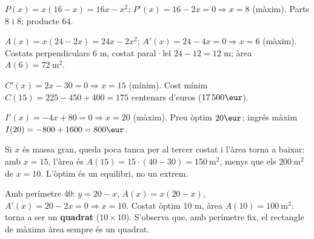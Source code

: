 \begin{solucions}
\begin{sollist}
  \item $P(x)=x(16-x)=16x-x^2$; $P'(x)=16-2x=0\Rightarrow x=8$ (màxim). Parts $8$ i $8$;
        producte $64$.
  \item $A(x)=x(24-2x)=24x-2x^2$; $A'(x)=24-4x=0\Rightarrow x=6$ (màxim). Costats
        perpendiculars $6$ m, costat paral·lel $24-12=12$ m; àrea $A(6)=72\ \text{m}^2$.
  \item $C'(x)=2x-30=0\Rightarrow x=15$ (mínim). Cost mínim $C(15)=225-450+400=175$
        centenars d'euros ($17\,500\eur$).
  \item $I'(x)=-4x+80=0\Rightarrow x=20$ (màxim). Preu òptim $20\eur$; ingrés màxim
        $I(20)=-800+1600=800\eur$.
  \item Si $x$ és massa gran, queda poca tanca per al tercer costat i l'àrea torna a
        baixar: amb $x=15$, l'àrea és $A(15)=15\cdot(40-30)=150\ \text{m}^2$, menys que
        els $200\ \text{m}^2$ de $x=10$. L'òptim és un equilibri, no un extrem.
  \item Amb perímetre $40$: $y=20-x$, $A(x)=x(20-x)$, $A'(x)=20-2x=0\Rightarrow x=10$.
        Costat òptim $10$ m, àrea $A(10)=100\ \text{m}^2$: torna a ser un
        \textbf{quadrat} ($10\times 10$). S'observa que, amb perímetre fix, el rectangle
        de màxima àrea sempre és un quadrat.
\end{sollist}
\end{solucions}
